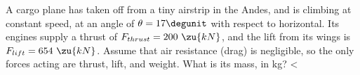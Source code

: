 A cargo plane has taken off from a tiny airstrip in the
        Andes, and is climbing at constant speed, at an angle of
        $\theta=17\degunit$ with respect to horizontal.  Its engines supply a
        thrust of $F_{thrust}=200\ \zu{kN}$, and the lift from its wings is
        $F_{lift}=654\ \zu{kN}$.  Assume that air resistance (drag) is
        negligible, so the only forces acting are thrust, lift, and
        weight.  What is its mass, in kg?
        <%
